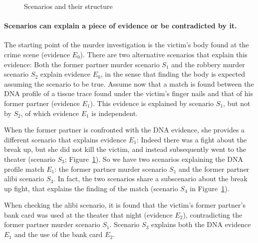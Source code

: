 \documentclass[10pt]{article}
\begin{document}
\begin{figure}[bt]
\centering

\caption{Scenarios and their structure\label{fig:scens}}
\end{figure}

\paragraph{Scenarios can explain a piece of evidence or be contradicted by it.} The starting point of the murder investigation is the victim's body found at the crime scene (evidence $E_0$). There are two alternative scenarios that explain this evidence: Both the former partner murder scenario $S_1$ and the robbery murder scenario $S_2$ explain evidence $E_0$, in the sense that finding the body is expected assuming the scenario to be true. Assume now that a match is found between the DNA profile of a tissue trace found under the victim's finger nails and that of his former partner (evidence $E_1$). This evidence is explained by scenario $S_1$, but not by $S_2$, of which evidence $E_1$ is independent. 

When the former partner is confronted with the DNA evidence, she provides a different scenario that explains evidence $E_1$: Indeed there was a fight about the break up, but she did not kill the victim, and instead subsequently went to the theater (scenario $S_3$; Figure~\ref{fig:scens}). So we have two scenarios explaining the DNA profile match $E_1$: the former partner murder scenario $S_1$ and the former partner alibi scenario $S_3$. In fact, the two scenarios share a subscenario about the break up fight, that explains the finding of the match (scenario $S_4$ in Figure~\ref{fig:scens}).

When checking the alibi scenario, it is found that the victim's former partner's bank card was used at the theater that night (evidence $E_2$), contradicting the former partner murder scenario $S_1$. Scenario $S_3$ explains both the DNA evidence $E_1$ and the use of the bank card $E_2$. 
\end{document}
